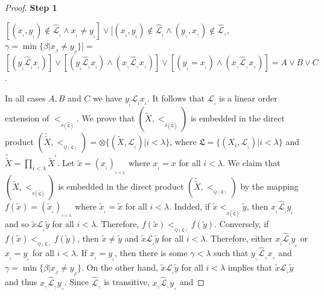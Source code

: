 \documentclass{article}
\theoremstyle{definition}
\begin{document}
\begin{proof}{\bf Step 1}
\begin{center}
$[(x_{_i},y_{_i})\notin \widehat{\mathcal{L}}_{_i}\wedge x_{_i}\neq y_{_i}]\vee [(x_{_i},y_{_i})\notin 
\widehat{\mathcal{L}}_{_i}
\wedge(y_{_\gamma},x_{_\gamma})\notin \widehat{\mathcal{L}}_{_\gamma}$, $\gamma=\min\{\beta\vert
x_{_\beta}\neq y_{_\beta}\}]=$\\ 
$[(y_{_i}\widehat{\mathcal{L}}_{_i} x_{_i})]\vee [(y_{_i}\widehat{\mathcal{L}}_{_i} x_{_i})\wedge (x_{_\gamma}\widehat{\mathcal{L}}_{_\gamma} x_{_\gamma})]\vee [(y_{_i}=x_{_i})\wedge (x_{_\gamma}
\widehat{\mathcal{L}}_{_\gamma} x_{_\gamma})]=
A\vee B\vee C$.
\end{center}
In all cases $A, B$ and $C$
we have $y_{_i} \mathcal{L}_{_i} x_{_i}$.
 It follows that 
$\mathcal{L}_{_i}$ is a linear order extension of $<_{_{S(\widehat{\mathfrak{L}})}}$.
We prove that $(\widetilde{X},<_{_{S(\widehat{\mathfrak{L}})}})$ 
is embedded in the direct product
$(\widetilde{\widetilde{X}},<_{_{Q(\mathfrak{L})}})=\otimes\{(\widetilde{X},\mathcal{L}_{_i})\vert i<\lambda\}$,
where $\mathfrak{L}=\{(X_i, \mathcal{L}_{_i})\vert i<\lambda\}$ and $\widetilde{\widetilde{X}}=
\displaystyle\prod_{i<\lambda}\widetilde{X}^{^i}$.
Let $\widetilde{x}=(x_{_i})_{_{i<\lambda}}$
where $x_{_i}=x$ for all $i<\lambda$.
We claim that $(\widetilde{X},<_{_{S(\widehat{\mathfrak{L}})}})$
is embedded in the direct product $(\widetilde{\widetilde{X}},<_{_{Q(\mathfrak{L})}})$
by the mapping
$f(\widetilde{x})=(\widetilde{x}_{_i})_{_{i<\lambda}}$
where $\widetilde{x}_{_i}=\widetilde{x}$ for all $i<\lambda$. 
Indded, if $\widetilde{x} <_{_{S(\widehat{\mathfrak{L}})}} \widetilde{y}$, then $x_{_i}
\widehat{\mathcal{L}}_{_i}
y_{_i}$ 
and so $\widetilde{x} \mathcal{L}_{_i} \widetilde{y}$ for all $i<\lambda$. 
Therefore, $f(\widetilde{x}) <_{_{Q(\mathfrak{L})}} f(\widetilde{y})$. Conversely, if $f(\widetilde{x}) <_{_{Q(\mathfrak{L})}} f(\widetilde{y})$, then
$\widetilde{x}\neq \widetilde{y}$ and $\widetilde{x} \mathcal{L}_{_i} \widetilde{y}$ for all $i<\lambda$.
Therefore, either 
$x_{_i}\widehat{\mathcal{L}}_{_i}y_{_i}$ or $x_{_i}=y_{_i}$
for all $i<\lambda$.
If $x_{_i}=y_{_i}$, then there is some $\gamma<\lambda$ such that
$y_{_\gamma}\widehat{\mathcal{L}}_{_\gamma} x_{_\gamma}$
and $\gamma=\min\{\beta\vert
x_{_\beta}\neq y_{_\beta}\}$.
On the other hand, 
$\widetilde{x} \mathcal{L}_{_i} \widetilde{y}$ for all $i<\lambda$ implies that
$\widetilde{x} \mathcal{L}_{_\gamma} \widetilde{y}$ and thus
$x_{_\gamma}\widehat{\mathcal{L}}_{_\gamma} y_{_\gamma}$.
Since $\widehat{\mathcal{L}}_{_\gamma}$ is transitive, 
$x_{_\gamma}\widehat{\mathcal{L}}_{_\gamma} y_{_\gamma}$ and

\end{proof}
\end{document}
